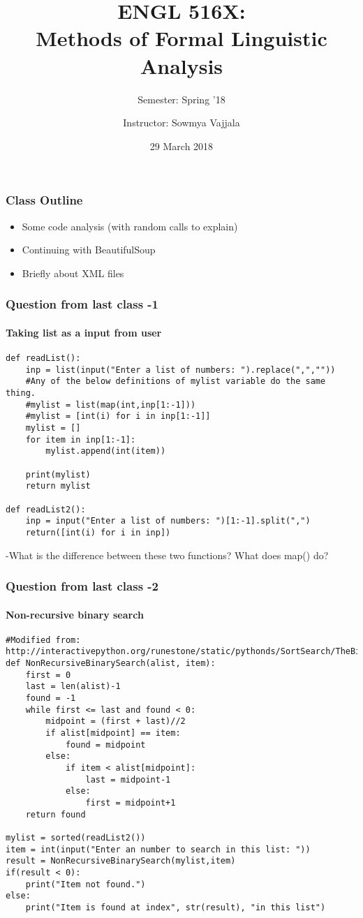 \documentclass{beamer}
\author[Sowmya Vajjala]{Instructor: Sowmya Vajjala}
\title[ENGL 516X]{ENGL 516X: \\ Methods of Formal Linguistic Analysis}
\subtitle{Semester: Spring '18}
\date{29 March 2018}
\institute{Iowa State University, USA}
\begin{document}
\begin{frame}\titlepage
\end{frame}

\begin{frame}
\frametitle{Class Outline}
\begin{itemize}
\item Some code analysis (with random calls to explain)
\item Continuing with BeautifulSoup
\item Briefly about XML files
\end{itemize}
\end{frame}

\begin{frame}[fragile]
\frametitle{Question from last class -1}
\framesubtitle{Taking list as a input from user}
\scriptsize
\begin{verbatim}
def readList():
    inp = list(input("Enter a list of numbers: ").replace(",",""))
    #Any of the below definitions of mylist variable do the same thing.
    #mylist = list(map(int,inp[1:-1]))
    #mylist = [int(i) for i in inp[1:-1]]
    mylist = []
    for item in inp[1:-1]:
        mylist.append(int(item))

    print(mylist)
    return mylist

def readList2():
    inp = input("Enter a list of numbers: ")[1:-1].split(",")
    return([int(i) for i in inp])
\end{verbatim}
-What is the difference between these two functions? What does map() do?
\end{frame}

\begin{frame}[fragile]
\frametitle{Question from last class -2}
\framesubtitle{Non-recursive binary search}
\tiny
\begin{verbatim}
#Modified from: http://interactivepython.org/runestone/static/pythonds/SortSearch/TheBinarySearch.html
def NonRecursiveBinarySearch(alist, item):
    first = 0
    last = len(alist)-1
    found = -1
    while first <= last and found < 0:
        midpoint = (first + last)//2
        if alist[midpoint] == item:
            found = midpoint
        else:
            if item < alist[midpoint]:
                last = midpoint-1
            else:
                first = midpoint+1
    return found

mylist = sorted(readList2())
item = int(input("Enter an number to search in this list: "))
result = NonRecursiveBinarySearch(mylist,item)
if(result < 0):
    print("Item not found.")
else:
    print("Item is found at index", str(result), "in this list")
\end{verbatim}
\end{frame}
\end{document}
